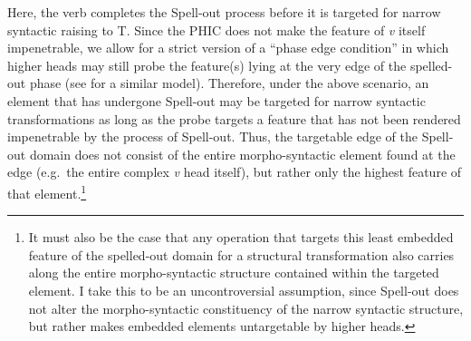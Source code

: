Here, the verb completes the Spell-out process before it is targeted for narrow syntactic raising to T. Since the PHIC does not make the feature of {\it v} itself impenetrable, we allow for a strict version of a ``phase edge condition'' in which higher heads may still probe the feature(s) lying at the very edge of the spelled-out phase (see \citet{fox_pesetsky2005} for a similar model). Therefore, under the above scenario, an element that has undergone Spell-out may be targeted for narrow syntactic transformations as long as the probe targets a feature that has not been rendered impenetrable by the process of Spell-out. Thus, the targetable edge of the Spell-out domain does not consist of the entire morpho-syntactic element found at the edge (e.g.\ the entire complex {\it v} head itself), but rather only the highest feature of that element.\footnote{It must also be the case that any operation that targets this least embedded feature of the spelled-out domain for a structural transformation also carries along the entire morpho-syntactic structure contained within the targeted element. I take this to be an uncontroversial assumption, since Spell-out does not alter the morpho-syntactic constituency of the narrow syntactic structure, but rather makes embedded elements untargetable by higher heads.}

